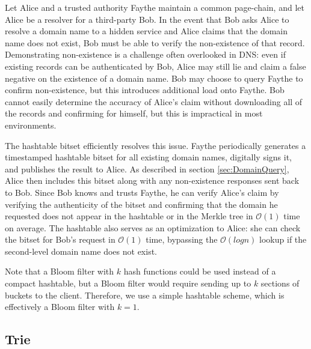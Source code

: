 Let Alice and a trusted authority Faythe maintain a common page-chain, and let Alice be a resolver for a third-party Bob. In the event that Bob asks Alice to resolve a domain name to a hidden service and Alice claims that the domain name does not exist, Bob must be able to verify the non-existence of that record. Demonstrating non-existence is a challenge often overlooked in DNS: even if existing records can be authenticated by Bob, Alice may still lie and claim a false negative on the existence of a domain name. Bob may choose to query Faythe to confirm non-existence, but this introduces additional load onto Faythe. Bob cannot easily determine the accuracy of Alice's claim without downloading all of the records and confirming for himself, but this is impractical in most environments.

The hashtable bitset efficiently resolves this issue. Faythe periodically generates a timestamped hashtable bitset for all existing domain names, digitally signs it, and publishes the result to Alice. As described in section \ref{sec:DomainQuery}, Alice then includes this bitset along with any non-existence responses sent back to Bob. Since Bob knows and trusts Faythe, he can verify Alice's claim by verifying the authenticity of the bitset and confirming that the domain he requested does not appear in the hashtable or in the Merkle tree in $ \mathcal{O}(1) $ time on average. The hashtable also serves as an optimization to Alice: she can check the bitset for Bob's request in $ \mathcal{O}(1) $ time, bypassing the $ \mathcal{O}(log n) $ lookup if the second-level domain name does not exist.

Note that a Bloom filter with $ k $ hash functions could be used instead of a compact hashtable, but a Bloom filter would require sending up to $ k $ sections of buckets to the client. Therefore, we use a simple hashtable scheme, which is effectively a Bloom filter with $ k = 1 $.




\subsection{Trie}

